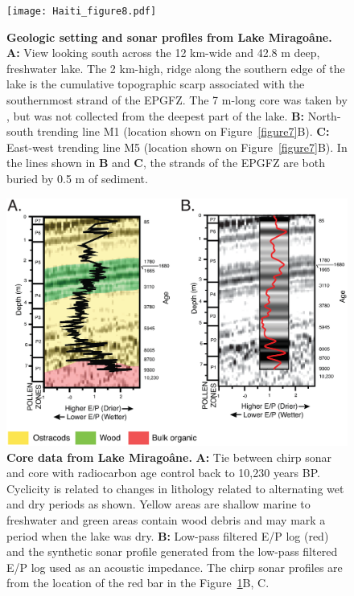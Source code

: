 \documentclass[linenumbers,draft]{agujournal}
\begin{document}
\begin{figure}
\centering
\texttt{[image: Haiti\_figure8.pdf]}
\caption{\textbf{Geologic setting and sonar profiles from Lake Mirago\^ane.} \textbf{A:} View looking south across the 12 km-wide and 42.8 m deep, freshwater lake. The 2 km-high, ridge along the southern edge of the lake is the cumulative topographic scarp associated with the southernmost strand of the EPGFZ. The 7 m-long core was taken by \citet{higuera199910}, but was not collected from the deepest part of the lake. \textbf{B:} North-south trending line M1 (location shown on Figure~\ref{figure7}B). \textbf{C:} East-west trending line M5 (location shown on Figure~\ref{figure7}B). In the lines shown in \textbf{B} and \textbf{C}, the strands of the EPGFZ are both buried by 0.5 m of sediment.}
\label{figure8}
\end{figure}

\begin{figure}
\centering
\includegraphics[width=\textwidth]{Haiti_figure9}
\caption{\textbf{Core data from Lake Mirago\^ane.} \textbf{A:} Tie between chirp sonar and core with radiocarbon age control back to 10,230 years BP. \citep{higuera199910} Cyclicity is related to changes in lithology related to alternating wet and dry periods as shown. Yellow areas are shallow marine to freshwater and green areas contain wood debris and may mark a period when the lake was dry. \textbf{B:} Low-pass filtered E/P log (red) and the synthetic sonar profile generated from the low-pass filtered E/P log used as an acoustic impedance. The chirp sonar profiles are from the location of the red bar in the Figure~\ref{figure8}B, C.}
\label{figure9}
\end{figure}
\end{document}
